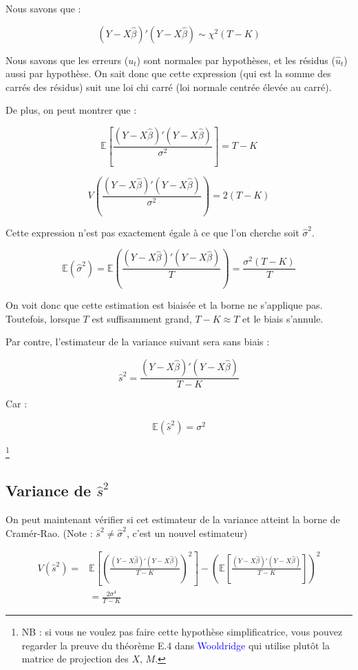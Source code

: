 \documentclass[14pt]{extarticle} %
\newcommand{\livre}[1]{\textcolor{blue}{#1}}
\begin{document}
Nous savons que :

\[
(Y - X\hat{\beta})'(Y - X\hat{\beta}) \sim \chi^2(T - K)
\]

Nous savons que les erreurs (\(u_t\)) sont normales par hypothèses, et les résidus (\(\hat{u}_t\)) aussi par hypothèse. On sait donc que cette expression (qui est la somme des carrés des résidus) suit une loi chi carré (loi normale centrée élevée au carré).

De plus, on peut montrer que :

\[
\mathbb{E}\left[ \frac{(Y - X\hat{\beta})'(Y - X\hat{\beta})}{\sigma^2} \right] = T - K
\]

\[
V\left( \frac{(Y - X\hat{\beta})'(Y - X\hat{\beta})}{\sigma^2} \right) = 2(T - K)
\]

Cette expression n’est pas exactement égale à ce que l’on cherche soit \(\hat{\sigma}^2\).

\[
\mathbb{E}(\hat{\sigma}^2) = \mathbb{E} \left( \frac{(Y - X\hat{\beta})'(Y - X\hat{\beta})}{T} \right) = \frac{\sigma^2 (T - K)}{T}
\]

On voit donc que cette estimation est biaisée et la borne ne s’applique pas. Toutefois, lorsque \(T\) est suffisamment grand, \(T - K \approx T\) et le biais s’annule.

Par contre, l’estimateur de la variance suivant sera sans biais :

\[
\hat{s}^2 = \frac{(Y - X\hat{\beta})'(Y - X\hat{\beta})}{T - K}
\]

Car :

\[
\mathbb{E}(\hat{s}^2) = \sigma^2
\]

\footnote{NB : si vous ne voulez pas faire cette hypothèse simplificatrice, vous pouvez regarder la preuve du théorème E.4 dans \livre{Wooldridge} qui utilise plutôt la matrice de projection des \(X\), \(M\).}

\subsection{Variance de \(\hat{s}^2\)}

On peut maintenant vérifier si cet estimateur de la variance atteint la borne de Cramér-Rao. (Note : \(\hat{s}^2 \neq \hat{\sigma}^2\), c’est un nouvel estimateur)

\begin{align*}
V(\hat{s}^2) = & \mathbb{E}\left[ \left( \frac{(Y - X\hat{\beta})'(Y - X\hat{\beta})}{T - K} \right)^2 \right] - \left( \mathbb{E}\left[ \frac{(Y - X\hat{\beta})'(Y - X\hat{\beta})}{T - K} \right] \right)^2 \\
&= \frac{2\sigma^4}{T - K}
\end{align*}
\end{document}
